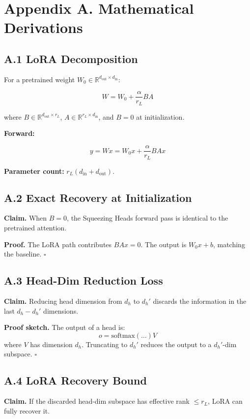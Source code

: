 
\section{Appendix A. Mathematical Derivations}

\subsection{A.1 LoRA Decomposition}

For a pretrained weight $W_0 \in \mathbb{R}^{d_\text{out} \times d_\text{in}}$:

\[
W = W_0 + \frac{\alpha}{r_L} B A
\]

where $B \in \mathbb{R}^{d_\text{out} \times r_L}$, $A \in \mathbb{R}^{r_L \times d_\text{in}}$, and $B = 0$ at initialization.

\textbf{Forward:}

\[
y = W x = W_0 x + \frac{\alpha}{r_L} B A x
\]

\textbf{Parameter count:} $r_L (d_\text{in} + d_\text{out})$.

\subsection{A.2 Exact Recovery at Initialization}

\textbf{Claim.} When $B = 0$, the Squeezing Heads forward pass is identical to 
the pretrained attention.

\textbf{Proof.} The LoRA path contributes $B A x = 0$. The output is $W_0 x + b$, 
matching the baseline. $\square$

\subsection{A.3 Head-Dim Reduction Loss}

\textbf{Claim.} Reducing head dimension from $d_h$ to $d_h'$ discards the 
information in the last $d_h - d_h'$ dimensions.

\textbf{Proof sketch.} The output of a head is:
\[
o = \text{softmax}(\ldots) V
\]
where $V$ has dimension $d_h$. Truncating to $d_h'$ reduces the output to 
a $d_h'$-dim subspace. $\square$

\subsection{A.4 LoRA Recovery Bound}

\textbf{Claim.} If the discarded head-dim subspace has effective rank $\leq r_L$, 
LoRA can fully recover it.

